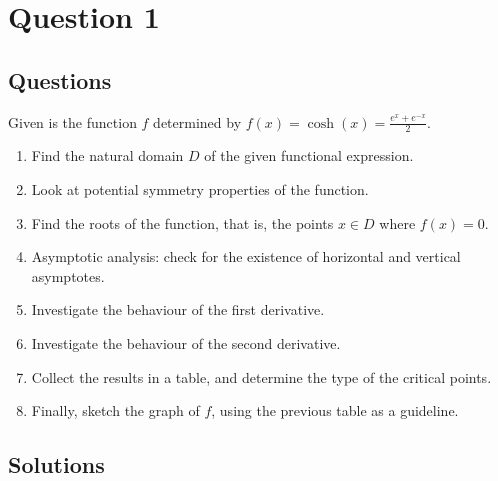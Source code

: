 \chapter{Question 1}
\section{Questions}
Given is the function $f$ determined by
$f(x) = \cosh(x) = \frac{e^x + e^{-x}}{2}$.
\begin{enumerate}
  \item Find the natural domain $D$ of the given functional expression.
  \item Look at potential symmetry properties of the function.
  \item Find the roots of the function, that is, the points $x \in D$ where
  $f(x) = 0$.
  \item Asymptotic analysis: check for the existence of horizontal and vertical
  asymptotes.
  \item Investigate the behaviour of the first derivative.
  \item Investigate the behaviour of the second derivative.
  \item Collect the results in a table, and determine the type of the critical
  points.
  \item Finally, sketch the graph of $f$, using the previous table as a
  guideline.
\end{enumerate}

\section{Solutions}

